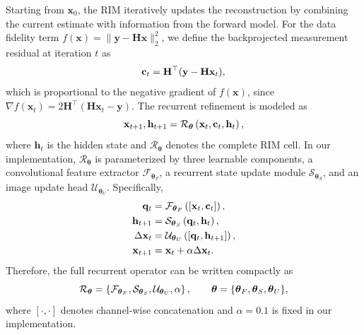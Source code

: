 \documentclass[conference]{IEEEtran}
\begin{document}
Starting from $\mathbf{x}_0$, the RIM iteratively updates the reconstruction by combining the current estimate with information from the forward model. For the data fidelity term $f(\mathbf{x})=\|\mathbf{y}-\mathbf{H}\mathbf{x}\|_2^2$, we define the backprojected measurement residual at iteration $t$ as
\vspace{-2mm}
\begin{equation}
    \mathbf{c}_t = \mathbf{H}^{\top}(\mathbf{y}-\mathbf{H}\mathbf{x}_t),
    \label{eq:correction}
    \vspace{-2mm}
\end{equation}
which is proportional to the negative gradient of $f(\mathbf{x})$, since $\nabla f(\mathbf{x}_t)=2\mathbf{H}^{\top}(\mathbf{H}\mathbf{x}_t-\mathbf{y})$. The recurrent refinement is modeled as
\vspace{-2mm}
\begin{equation}
    \mathbf{x}_{t+1}, \mathbf{h}_{t+1} 
    =
    \mathcal{R}_{\boldsymbol{\theta}}
    \left(
        \mathbf{x}_{t}, 
        \mathbf{c}_{t}, 
        \mathbf{h}_{t}
    \right),
    \label{eq:rim_update}
    \vspace{-2mm}
\end{equation}
where $\mathbf{h}_t$ is the hidden state and $\mathcal{R}_{\boldsymbol{\theta}}$ denotes the complete RIM cell.
In our implementation, $\mathcal{R}_{\boldsymbol{\theta}}$ is parameterized by three learnable components, a convolutional feature extractor $\mathcal{F}_{\boldsymbol{\theta}_F}$, a recurrent state update module  $\mathcal{S}_{\boldsymbol{\theta}_S}$, and an image update head $\mathcal{U}_{\boldsymbol{\theta}_U}$. Specifically,
\vspace{-2mm}
\begin{align}
    \mathbf{q}_t 
    &= 
    \mathcal{F}_{\boldsymbol{\theta}_F}
    \left(
        [\mathbf{x}_t,\mathbf{c}_t]
    \right), \\
    \mathbf{h}_{t+1} 
    &= 
    \mathcal{S}_{\boldsymbol{\theta}_S}
    \left(
        \mathbf{q}_t,\mathbf{h}_t
    \right), \\
    \Delta \mathbf{x}_t 
    &= 
    \mathcal{U}_{\boldsymbol{\theta}_U}
    \left(
        [\mathbf{q}_t,\mathbf{h}_{t+1}]
    \right), \\
    \mathbf{x}_{t+1} 
    &= 
    \mathbf{x}_t + \alpha \Delta \mathbf{x}_t.
    \vspace{-2mm}
\end{align}
Therefore, the full recurrent operator can be written compactly as
\vspace{-2mm}
\begin{equation}
    \mathcal{R}_{\boldsymbol{\theta}}
    =
    \left\{
    \mathcal{F}_{\boldsymbol{\theta}_F},
    \mathcal{S}_{\boldsymbol{\theta}_S},
    \mathcal{U}_{\boldsymbol{\theta}_U},
    \alpha
    \right\},
    \qquad
    \boldsymbol{\theta} =
    \{\boldsymbol{\theta}_F,\boldsymbol{\theta}_S,\boldsymbol{\theta}_U\},
    \vspace{-2mm}
\end{equation}
where $[\cdot,\cdot]$ denotes channel-wise concatenation and $\alpha=0.1$ is fixed in our implementation.
\end{document}
